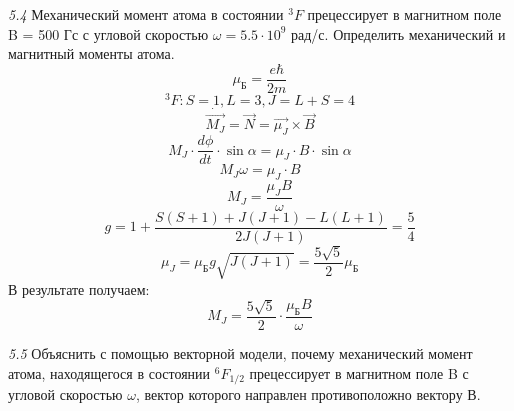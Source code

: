	\emph{5.4 }
		Механический момент атома в состоянии \( ^3F \) прецессирует 
		в магнитном поле B = 500 Гс с угловой скоростью 
		\( \omega = 5.5\cdot10^9 \) рад/с. Определить механический 
		и магнитный моменты атома.
		\[ \mu_\text{Б} = \frac{e\hbar}{2m} \]
		\[ ^3F: S = 1, L = 3, J = L+S = 4 \]
		\[ \dot{\vec{M_J}} = \vec{N} = \vec{\mu_J}\times\vec{B} \]
		\[ M_J\cdot\frac{d\phi}{dt}\cdot\sin\alpha = \mu_J\cdot B\cdot\sin\alpha \]
		\[ M_J\omega = \mu_J\cdot B \]
		\[ M_J = \frac{\mu_JB}{\omega} \]
		\[ g = 1 + \frac{S(S+1)+J(J+1)-L(L+1)}{2J(J+1)} = \frac{5}{4} \]
		\[ \mu_J = \mu_\text{Б}g\sqrt{J(J+1)} = \frac{5\sqrt{5}}{2}\mu_\text{Б} \]
		В результате получаем:
		\[ M_J = \frac{5\sqrt{5}}{2}\cdot\frac{\mu_\text{Б}B}{\omega} \]

	\emph{5.5 }
		Объяснить с помощью векторной модели, почему механический момент
		атома, находящегося в состоянии \(^6F_{1/2} \) прецессирует в 
		магнитном поле B с угловой скоростью \( \omega \), вектор 
		которого направлен противоположно вектору В.

